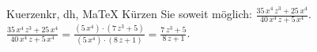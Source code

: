 \begin{MAufgabe}{Kuerzen}{kr, dh, MaTeX}
K\"urzen Sie soweit m\"oglich: $\frac{35\, x^4\, z^3 + 25\, x^4}{40\, x^4\, z + 5\, x^4}$.\\ 
\ifLsg\MLoesung
\quad $\frac{35\, x^4\, z^3 + 25\, x^4}{40\, x^4\, z + 5\, x^4}=\frac{(5\, x^4)\cdot(7\, z^3 + 5)}{(5\, x^4)\cdot(8\, z + 1)}=\frac{7\, z^3 + 5}{8\, z + 1}$.\else\relax\fi
 \end{MAufgabe}